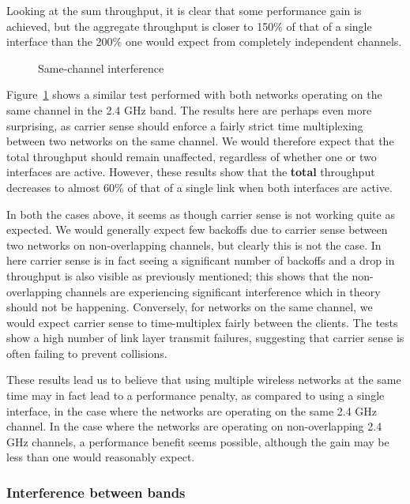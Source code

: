 Looking at the sum throughput, it is clear that some performance gain is
achieved, but the aggregate throughput is closer to 150\% of that of a single
interface than the 200\% one would expect from completely independent channels.

\begin{figure}[h]
 \centering
 
 \caption{Same-channel interference}\label{graph:sc-interference}
\end{figure}

Figure~\ref{graph:sc-interference} shows a similar test performed with both
networks operating on the same channel in the 2.4 GHz band. The results here are
perhaps even more surprising, as carrier sense should enforce a fairly strict
time multiplexing between two networks on the same channel. We would therefore
expect that the total throughput should remain unaffected, regardless of
whether one or two interfaces are active. However, these results show that the
\textbf{total} throughput decreases to almost 60\% of that of a single link when
both interfaces are active.

In both the cases above, it seems as though carrier sense is not working quite
as expected. We would generally expect few backoffs due to carrier sense between
two networks on non-overlapping channels, but clearly this is not the case. In here carrier sense is in fact seeing a significant number of backoffs and a drop in throughput is also visible as previously mentioned; this shows that the non-overlapping channels are experiencing significant interference which in theory should not be happening.
Conversely, for networks on the same channel, we would expect carrier sense to
time-multiplex fairly between the clients. The tests show a high number of 
link layer transmit failures, suggesting that carrier sense is often failing 
to prevent collisions.

These results lead us to believe that using multiple wireless networks at the
same time may in fact lead to a performance penalty, as compared to using a
single interface, in the case where the networks are operating on the same 2.4
GHz channel. In the case where the networks are operating on non-overlapping 2.4
GHz channels, a performance benefit seems possible, although the gain may be less
than one would reasonably expect.


\subsubsection{Interference between bands}

